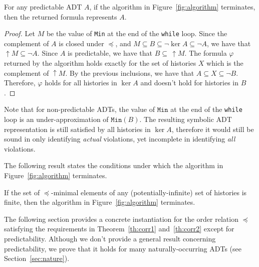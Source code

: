 \begin{theorem}\label{th:corr1}
For any predictable ADT $A$, if the algorithm in Figure~\ref{fig:algorithm} terminates, then the returned formula represents $A$.
\end{theorem}
\begin{proof}
Let $M$ be the value of \texttt{Min} at the end of the \texttt{while} loop.
Since the complement of $A$ is closed under $\preceq$, and $M\subseteq B\subseteq  \neg \ker A \subseteq \neg A$, we have that $\uparrow M\subseteq \neg A$. 
Since $A$ is predictable, we have that $B \subseteq\, \uparrow M$.
The formula $\varphi$ returned by the algorithm holds exactly for the set of histories $X$ 
which is the complement of $\uparrow M$. By the previous inclusions, we have that $A\subseteq X\subseteq \neg B$.
Therefore, $\varphi$ holds for all histories in $\ker A$ and doesn't hold for histories in $B$. 
\end{proof}

\begin{remark}
Note that for non-predictable ADTs, the value of $\texttt{Min}$ at the end of the \texttt{while} loop 
is an under-approximation of $\texttt{Min}(B)$. 
The resulting symbolic ADT representation is still satisfied by all histories in $\ker A$, therefore it would still be sound in only identifying
\emph{actual} violations, yet incomplete in identifying \emph{all} violations.
\end{remark}

The following result states the conditions under which the algorithm in Figure~\ref{fig:algorithm} terminates.

\begin{theorem}\label{th:corr2}
If the set of $\preceq$-minimal elements of any (potentially-infinite) set of histories is finite, then the algorithm in Figure~\ref{fig:algorithm} terminates.
\end{theorem}

The following section provides a concrete instantiation for the order relation $\preceq$ satisfying the requirements in 
Theorem~\ref{th:corr1} and~\ref{th:corr2} except for predictability. 
Although we don't provide a general result concerning predictability, we prove that it holds for many naturally-occurring ADTs (see Section~\ref{sec:nature}).




